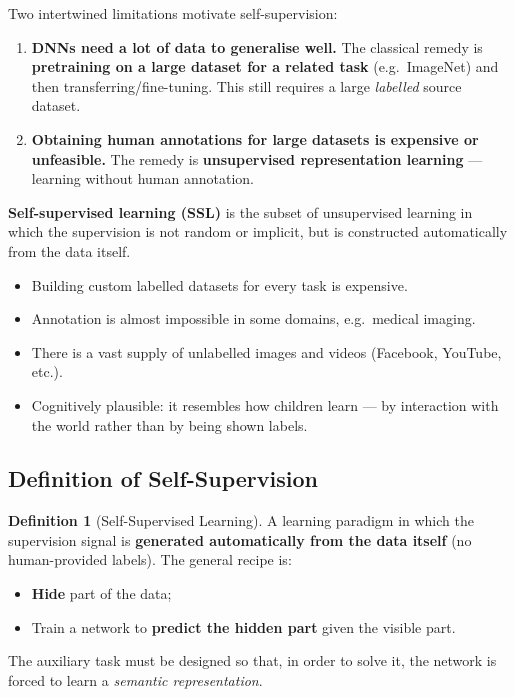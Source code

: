 \documentclass[11pt,a4paper]{article}
\theoremstyle{definition}
\newtheorem{definition}{Definition}[section]
\theoremstyle{plain}
\theoremstyle{remark}
\begin{document}
Two intertwined limitations motivate self-supervision:

\begin{enumerate}
    \item \textbf{DNNs need a lot of data to generalise well.} The classical remedy is \textbf{pretraining on a large dataset for a related task} (e.g.\ ImageNet) and then transferring/fine-tuning. This still requires a large \emph{labelled} source dataset.
    \item \textbf{Obtaining human annotations for large datasets is expensive or unfeasible.} The remedy is \textbf{unsupervised representation learning} --- learning without human annotation.
\end{enumerate}

\textbf{Self-supervised learning (SSL)} is the subset of unsupervised learning in which the supervision is not random or implicit, but is constructed automatically from the data itself.

\begin{tcolorbox}[colback=yellow!5!white,colframe=orange!80!black,title=\textbf{Why Self-Supervision?}]
\begin{itemize}[leftmargin=*]
    \item Building custom labelled datasets for every task is expensive.
    \item Annotation is almost impossible in some domains, e.g.\ medical imaging.
    \item There is a vast supply of unlabelled images and videos (Facebook, YouTube, etc.).
    \item Cognitively plausible: it resembles how children learn --- by interaction with the world rather than by being shown labels.
\end{itemize}
\end{tcolorbox}

\subsection{Definition of Self-Supervision}

\begin{definition}[Self-Supervised Learning]
A learning paradigm in which the supervision signal is \textbf{generated automatically from the data itself} (no human-provided labels). The general recipe is:
\begin{itemize}
    \item \textbf{Hide} part of the data;
    \item Train a network to \textbf{predict the hidden part} given the visible part.
\end{itemize}
The auxiliary task must be designed so that, in order to solve it, the network is forced to learn a \emph{semantic representation}.
\end{definition}
\end{document}
